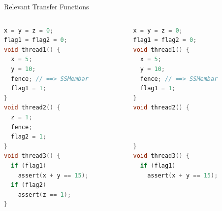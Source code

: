 \documentclass[t]{beamer}
\begin{document}
\begin{frame}[fragile]{Relevant Transfer Functions}
  \begin{columns}[c]
    \begin{column}{0.5\textwidth}
\begin{lstlisting}[language=C]
x = y = z = 0;
flag1 = flag2 = 0;
void thread1() { 
  x = 5;
  y = 10;
  fence; // ==> SSMembar
  flag1 = 1;
}
void thread2() { 
  z = 1;
  fence;
  flag2 = 1;
}
void thread3() {
  if (flag1)
    assert(x + y == 15);
  if (flag2)
    assert(z == 1);
}
\end{lstlisting}%
    \end{column}%
    \pause
    \begin{column}{0.5\textwidth}%
      \begin{lstlisting}[language=C]
x = y = z = 0;
flag1 = flag2 = 0;
void thread1() { 
  x = 5;
  y = 10;
  fence; // ==> SSMembar
  flag1 = 1;
}
void thread2() { 



}
void thread3() {
  if (flag1)
    assert(x + y == 15);



\end{lstlisting}
\end{column}
\end{columns}
\end{frame}
\end{document}
